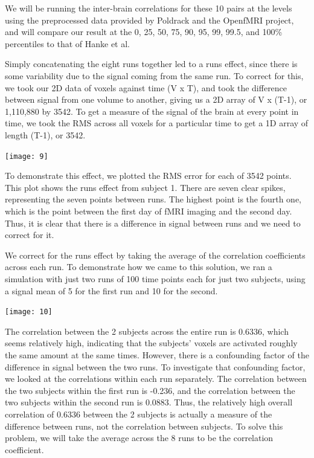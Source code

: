 \documentclass[11pt]{article}
\begin{document}
We will be running the inter-brain correlations for these 10 pairs at the 
levels using the preprocessed data provided by Poldrack and the OpenfMRI project, 
and will compare our result at the 0, 25, 50, 75, 90, 95, 99, 99.5, and 100\%
percentiles to that of Hanke et al.

Simply concatenating the eight runs together led to a runs effect, since there
is some variability due to the signal coming from the same run. To correct for 
this, we took our 2D data of voxels against time (V x T), and took the difference 
between signal from one volume to another, giving us a 2D array of V x (T-1), or
1,110,880 by 3542. To get a measure of the signal of the brain at every point in
time, we took the RMS across all voxels for a particular time to get a 1D array 
of length (T-1), or 3542. 

\begin{center}                                                                  
\texttt{[image: 9]}                                                 
\end{center}   

To demonstrate this effect, we plotted the RMS error for each of 3542 points.  
This plot shows the runs effect from subject 1.  There are seven clear spikes, 
representing the seven points between runs.  The highest point is the fourth 
one, which is the point between the first day of fMRI imaging and the second
day.  Thus, it is clear that there is a difference in signal between runs and
we need to correct for it.  

We correct for the runs effect by taking the average of the correlation 
coefficients across each run.  To demonstrate how we came to this solution, 
we ran a simulation with just two runs of 100 time points each for just two 
subjects, using a signal mean of 5 for the first run and 10 for the second.  
\begin{center}                                                                  
\texttt{[image: 10]} 
\end{center}  
The correlation between the 2 subjects across the entire run is 0.6336, which
seems relatively high, indicating that the subjects' voxels are activated 
roughly the same amount at the same times.  However, there is a confounding
factor of the difference in signal between the two runs.  To investigate that
confounding factor, we looked at the correlations within each run separately.  
The correlation between the two subjects within the first run is -0.236, and 
the correlation between the two subjects within the second run is 0.0883.  
Thus, the relatively high overall correlation of 0.6336 between the 2 subjects 
is actually a measure of the difference between runs, not the correlation 
between subjects.  To solve this problem, we will take the average across the 8
runs to be the correlation coefficient.
\end{document}
